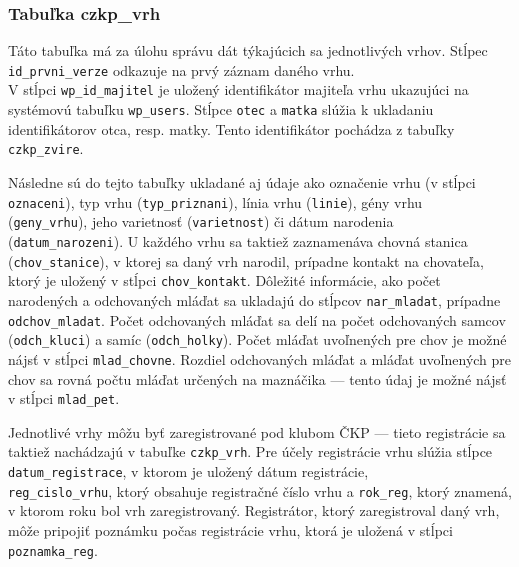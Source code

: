 \subsubsection{Tabuľka czkp\_vrh}

Táto tabuľka má za úlohu správu dát týkajúcich sa jednotlivých vrhov. Stĺpec \texttt{id_prvni_verze} odkazuje na prvý záznam daného vrhu. \\ V stĺpci \texttt{wp_id_majitel} je uložený identifikátor majiteľa vrhu ukazujúci na systémovú tabuľku \texttt{wp_users}. Stĺpce \texttt{otec} a \texttt{matka} slúžia k ukladaniu identifikátorov otca, resp. matky. Tento identifikátor pochádza z tabuľky \texttt{czkp_zvire}.

Následne sú do tejto tabuľky ukladané aj údaje ako označenie vrhu (v stĺpci \texttt{oznaceni}), typ vrhu (\texttt{typ_priznani}), línia vrhu (\texttt{linie}), gény vrhu \\ (\texttt{geny_vrhu}), jeho varietnosť (\texttt{varietnost}) či dátum narodenia \\ (\texttt{datum_narozeni}). U každého vrhu sa taktiež zaznamenáva chovná stanica (\texttt{chov_stanice}), v ktorej sa daný vrh narodil, prípadne kontakt na chovateľa, ktorý je uložený v stĺpci \texttt{chov_kontakt}. Dôležité informácie, ako počet narodených a odchovaných mláďat sa ukladajú do stĺpcov \texttt{nar_mladat}, prípadne \texttt{odchov_mladat}. Počet odchovaných mláďat sa delí na počet odchovaných samcov (\texttt{odch_kluci}) a samíc (\texttt{odch_holky}). Počet mláďat uvoľnených pre chov je možné nájsť v stĺpci \texttt{mlad_chovne}. Rozdiel odchovaných mláďat a mláďat uvoľnených pre chov sa rovná počtu mláďat určených na maznáčika --- tento údaj je možné nájsť v stĺpci \texttt{mlad_pet}.

Jednotlivé vrhy môžu byť zaregistrované pod klubom ČKP --- tieto registrácie sa taktiež nachádzajú v tabuľke \texttt{czkp_vrh}. Pre účely registrácie vrhu slúžia stĺpce \texttt{datum_registrace}, v ktorom je uložený dátum registrácie, \\ \texttt{reg_cislo_vrhu}, ktorý obsahuje registračné číslo vrhu a \texttt{rok_reg}, ktorý znamená, v ktorom roku bol vrh zaregistrovaný. Registrátor, ktorý zaregistroval daný vrh, môže pripojiť poznámku počas registrácie vrhu, ktorá je uložená v stĺpci \texttt{poznamka_reg}.

